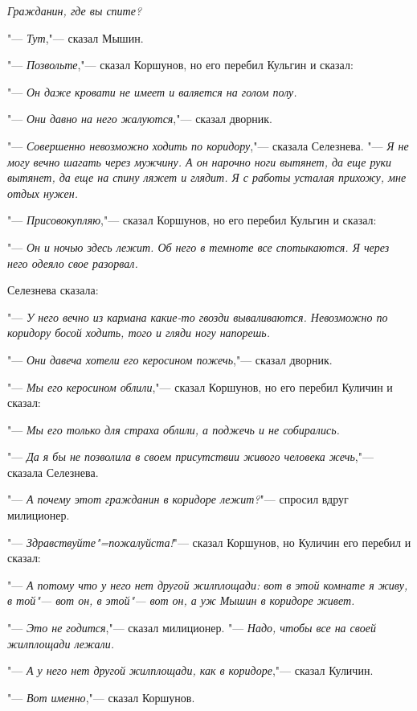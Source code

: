 \textit{Гражданин, где вы спите?}

"--- \textit{Тут},"--- сказал Мышин.

"--- \textit{Позвольте},"--- сказал Коршунов, но его перебил Кульгин и сказал:

"--- \textit{Он даже кровати не имеет и валяется на голом полу.}

"--- \textit{Они давно на него жалуются},"--- сказал дворник.

"--- \textit{Совершенно невозможно ходить по коридору},"--- сказала Селезнева. "--- \textit{Я не могу вечно шагать через мужчину. А он нарочно ноги вытянет, да еще руки вытянет, да еще на спину ляжет и глядит. Я с работы усталая прихожу, мне отдых нужен.}

"--- \textit{Присовокупляю},"--- сказал Коршунов, но его перебил Кульгин и сказал:

"--- \textit{Он и ночью здесь лежит. Об него в темноте все спотыкаются. Я через него одеяло свое разорвал.}

Селезнева сказала:

"--- \textit{У него вечно из кармана какие-то гвозди вываливаются. Невозможно по коридору босой ходить, того и гляди ногу напорешь.}

"--- \textit{Они давеча хотели его керосином пожечь},"--- сказал дворник.

"--- \textit{Мы его керосином облили},"--- сказал Коршунов, но его перебил Куличин и сказал:

"--- \textit{Мы его только для страха облили, а поджечь и не собирались.}

"--- \textit{Да я бы не позволила в своем присутствии живого человека жечь},"--- сказала Селезнева.

"--- \textit{А почему этот гражданин в коридоре лежит?}"--- спросил вдруг милиционер.

"--- \textit{Здравствуйте"=пожалуйста!}"--- сказал Коршунов, но Куличин его перебил и сказал:

"--- \textit{А потому что у него нет другой жилплощади: вот в этой комнате я живу, в той"--- вот он, в этой"--- вот он, а уж Мышин в коридоре живет.}

"--- \textit{Это не годится},"--- сказал милиционер. "--- \textit{Надо, чтобы все на своей жилплощади лежали.}

"--- \textit{А у него нет другой жилплощади, как в коридоре},"--- сказал Куличин.

"--- \textit{Вот именно},"--- сказал Коршунов.

